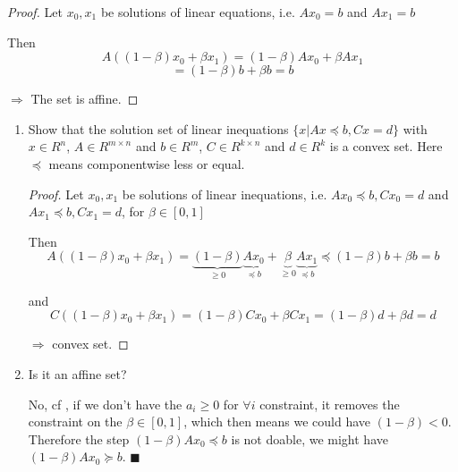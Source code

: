 

\begin{proof}
    Let $x_0, x_1$ be solutions of linear equations, i.e. $A x_0 = b$ and $A x_1 = b$

    Then $$A((1-\beta)x_0 + \beta x_1) = (1-\beta) A x_0 + \beta A x_1$$$$ = (1-\beta)b + \beta b = b$$

    $\Rightarrow$ The set is affine.
\end{proof}



\bigskip
\bigskip
{}

\begin{enumerate}
    \questioncolor
    \item Show that the solution set of linear inequations $\{x | Ax \preceq b, Cx = d\}$ with $x \in R^n$, $A \in R^{m×n}$ and $b \in R^m$, $C \in R^{k×n}$ and $d \in R^k$ is a convex set. Here $\preceq$ means componentwise less or equal. \normalcolor

    \begin{proof}
        Let $x_0, x_1$ be solutions of linear inequations, i.e. $A x_0 \preceq b, C x_0 = d$ and $A x_1 \preceq b, C x_1 = d$, for $\beta \in [0, 1]$

        Then
        \begin{equation}\label{eq:eq1}
            A((1-\beta)x_0 + \beta x_1) = \underbrace{(1-\beta)}_\text{$\ge 0$} \underbrace{A x_0}_\text{$\preceq b$} + \underbrace{\beta}_\text{$\ge 0$} \underbrace{A x_1}_\text{$\preceq b$} \preceq (1-\beta) b + \beta b = b
        \end{equation}

        and $$C((1-\beta) x_0 + \beta x_1) = (1-\beta) C x_0 + \beta C x_1 = (1-\beta) d + \beta d = d$$

        $\Rightarrow$ convex set.
    \end{proof}



    \questioncolor
    \item Is it an affine set? \normalcolor

    No, cf , if we don't have the $a_i \ge 0$ for $\forall i$ constraint, it removes the constraint on the $\beta \in [0,1]$, which then means we could have $(1-\beta) < 0$. Therefore the step $(1-\beta)Ax_0 \preceq b$ is not doable, we might have $(1-\beta)Ax_0 \succeq b$. \hfill $\blacksquare$
\end{enumerate}




